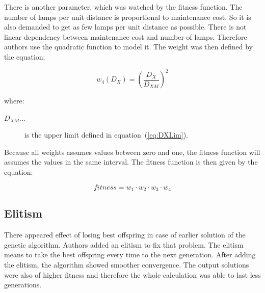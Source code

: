 There is another parameter, which was watched by the fitness function. The number of lamps per unit distance is proportional to maintenance cost. So it is also demanded to get as few lamps per unit distance as possible. There is not linear dependency between maintenance cost and number of lamps. Therefore authors use the quadratic function to model it. The weight was then defined by the equation:

\begin{equation}
w_4\left(D_X\right)= \left(\frac{D_{X}}{D_{XM}}\right)^2
\label{eq:w4}
\end{equation}

where:
\begin{description}
\item [$D_{XM}$...] is the upper limit defined in equation~(\ref{eq:DXLim}).
\end{description}

Because all weights assumes values between zero and one, the fitness function will assumes the values in the same interval. The fitness function is then given by the equation:

\begin{equation}
\textit{fitness}= w_1 \cdot w_2 \cdot w_3 \cdot w_4
\label{eq:fitness}
\end{equation}

\subsection{Elitism}
There appeared effect of losing best offspring in case of earlier solution of the genetic algorithm. Authors added an elitism to fix that problem. The elitism means to take the best offspring every time to the next generation. After adding the elitism, the algorithm showed smoother convergence. The output solutions were also of higher fitness and therefore the whole calculation was able to last less generations.